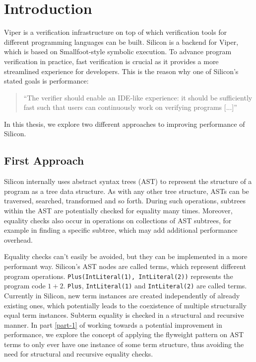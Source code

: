 \documentclass[11pt]{article}
\begin{document}
    \setcounter{tocdepth}{2}
    \tableofcontents
    \newpage


    \section{Introduction}

    Viper \cite{viper} is a verification infrastructure on top of which verification tools
    for different programming languages can be built. Silicon \cite{silicon} is a backend for Viper,
    which is based on Smallfoot-style \cite{smallfoot} symbolic execution. 
    To advance program verification in practice,
    fast verification is crucial as it provides a more streamlined experience for developers.
    This is the reason why one of Silicon's stated goals is performance:

    \begin{quote} 
        ``The verifier should enable an IDE-like experience: it should be
        sufficiently fast such that users can continuously work on verifying
        programs [...]'' \cite{silicon}
    \end{quote}

    In this thesis, we explore two different approaches to improving performance of Silicon.

    \subsection*{First Approach}

    Silicon internally uses abstract syntax trees (AST) to represent
    the structure of a program as a tree data structure. As with any other tree structure,
    ASTs can be traversed, searched, transformed and so forth. During such operations,
    subtrees within the AST are potentially checked for equality many times.  Moreover, equality checks
    also occur in operations on collections of AST subtrees, for example in finding
    a specific subtree, which may add additional performance overhead.

    Equality checks can't easily be avoided, but they can be implemented in a more performant way.
    Silicon's AST nodes are called terms, which represent different program operations.
    \texttt{Plus(IntLiteral(1), IntLiteral(2))} represents the program code $1 + 2$. \texttt{Plus}, \texttt{IntLiteral(1)}
    and \texttt{IntLiteral(2)} are called terms.
    Currently in Silicon, new term instances are created independently of already existing ones, which potentially leads 
    to the coexistence of multiple structurally equal term instances. Subterm equality is checked in a
    structural and recursive manner. In part \ref{part-1} of working towards a potential improvement in performance,
    we explore the concept of applying the flyweight pattern \cite{patterns} on AST terms to only ever have
    one instance of some term structure, thus avoiding the need for structural and recursive equality checks.
\end{document}
